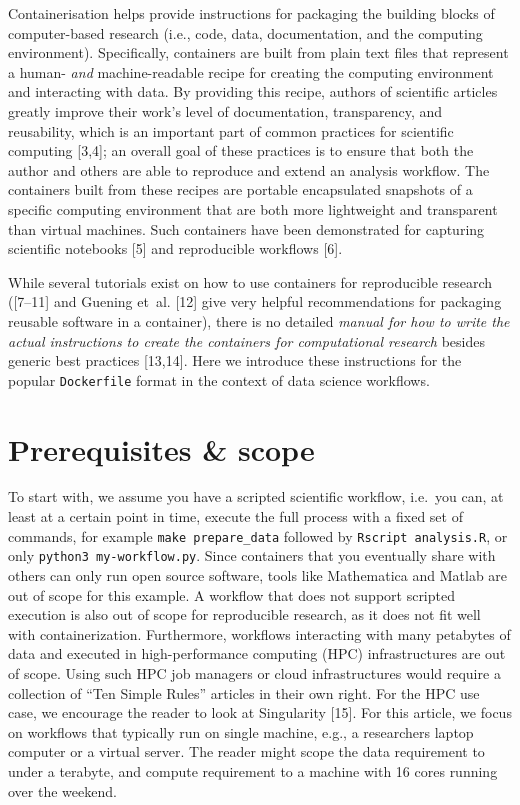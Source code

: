\documentclass[10pt,letterpaper]{article}
\begin{document}
Containerisation helps provide instructions for packaging the building
blocks of computer-based research (i.e., code, data, documentation, and
the computing environment). Specifically, containers are built from
plain text files that represent a human- \emph{and} machine-readable
recipe for creating the computing environment and interacting with data.
By providing this recipe, authors of scientific articles greatly improve
their work's level of documentation, transparency, and reusability,
which is an important part of common practices for scientific computing
{[}3,4{]}; an overall goal of these practices is to ensure that both the
author and others are able to reproduce and extend an analysis workflow.
The containers built from these recipes are portable encapsulated
snapshots of a specific computing environment that are both more
lightweight and transparent than virtual machines. Such containers have
been demonstrated for capturing scientific notebooks {[}5{]} and
reproducible workflows {[}6{]}.

While several tutorials exist on how to use containers for reproducible
research ({[}7--11{]} and Guening et~al. {[}12{]} give very helpful
recommendations for packaging reusable software in a container), there
is no detailed \emph{manual for how to write the actual instructions to
create the containers for computational research} besides generic best
practices {[}13,14{]}. Here we introduce these instructions for the
popular \texttt{Dockerfile} format in the context of data science
workflows.

\hypertarget{prerequisites-scope}{%
\section{Prerequisites \& scope}\label{prerequisites-scope}}

To start with, we assume you have a scripted scientific workflow,
i.e.~you can, at least at a certain point in time, execute the full
process with a fixed set of commands, for example
\texttt{make\ prepare\_data} followed by \texttt{Rscript\ analysis.R},
or only \texttt{python3\ my-workflow.py}. Since containers that you
eventually share with others can only run open source software, tools
like Mathematica and Matlab are out of scope for this example. A
workflow that does not support scripted execution is also out of scope
for reproducible research, as it does not fit well with
containerization. Furthermore, workflows interacting with many petabytes
of data and executed in high-performance computing (HPC) infrastructures
are out of scope. Using such HPC job managers or cloud infrastructures
would require a collection of ``Ten Simple Rules'' articles in their own
right. For the HPC use case, we encourage the reader to look at
Singularity {[}15{]}. For this article, we focus on workflows that
typically run on single machine, e.g., a researchers laptop computer or
a virtual server. The reader might scope the data requirement to under a
terabyte, and compute requirement to a machine with 16 cores running
over the weekend.
\end{document}
